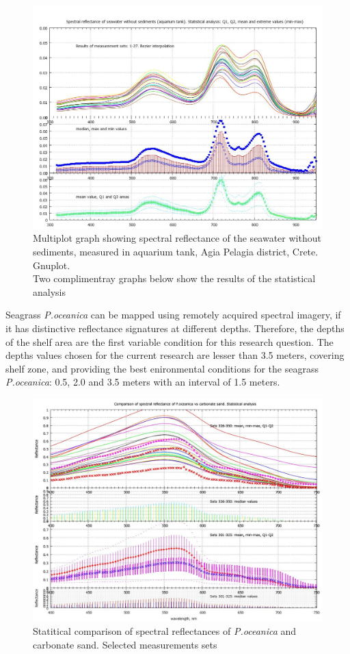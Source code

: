 \documentclass[10pt, a4paper]{article}
\begin{document}
\begin{figure}[H]
\centering
\includegraphics[scale=0.30]{GNU-21.jpg}
\caption{Multiplot graph showing spectral reflectance of the seawater without sediments, measured in aquarium tank, Agia Pelagia district, Crete. Gnuplot. \\Two complimentray graphs below show the results of the statistical analysis}
\label{fig:27}
\end{figure}

Seagrass \textit{P.oceanica} can be mapped using remotely acquired spectral imagery, if it has distinctive
reflectance signatures at different depths. Therefore, the depths of the shelf area are the first variable
condition for this research question. The depths values chosen for the current research are lesser than
3.5 meters, covering shelf zone, and providing the best enironmental conditions for the seagrass
\textit{P.oceanica}: 0.5, 2.0 and 3.5 meters with an interval of 1.5 meters. 

\begin{figure}[H]
\centering
\includegraphics[scale=0.30]{GNU-20.jpg}
\caption{Statitical comparison of spectral reflectances of \textit{P.oceanica} and carbonate sand. Selected measurements sets}
\label{fig:28}
\end{figure}
\end{document}
